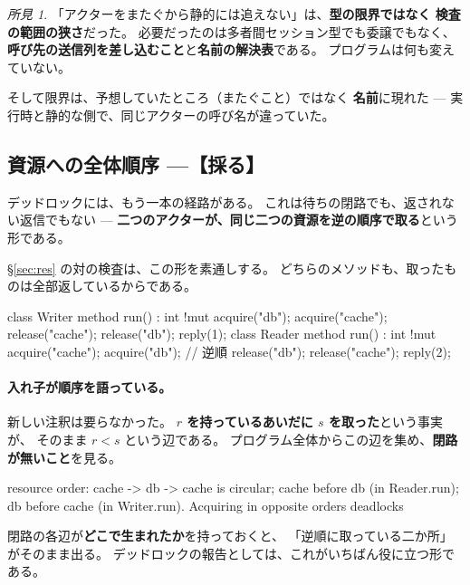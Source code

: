 \documentclass[11pt,a4paper]{ltjsarticle}
\theoremstyle{definition}
\theoremstyle{remark}
\newtheorem{finding}[theorem]{所見}
\begin{document}
\begin{finding}
「アクターをまたぐから静的には追えない」は、\textbf{型の限界ではなく
検査の範囲の狭さ}だった。
必要だったのは多者間セッション型でも委譲でもなく、
\textbf{呼び先の送信列を差し込むこと}と\textbf{名前の解決表}である。
プログラムは何も変えていない。

そして限界は、予想していたところ（またぐこと）ではなく
\textbf{名前}に現れた ---
実行時と静的な側で、同じアクターの呼び名が違っていた。
\end{finding}

\subsection{資源への全体順序 ---【採る】}

\label{sec:resorder}

デッドロックには、もう一本の経路がある。
これは待ちの閉路でも、返されない返信でもない ---
\textbf{二つのアクターが、同じ二つの資源を逆の順序で取る}という形である。

\S\ref{sec:res} の対の検査は、この形を素通しする。
どちらのメソッドも、取ったものは全部返しているからである。

\begin{aipl}
class Writer {
  method run() : int !{mut} {
    acquire("db"); acquire("cache");
    release("cache"); release("db"); reply(1);
  }
}
class Reader {
  method run() : int !{mut} {
    acquire("cache"); acquire("db");     // 逆順
    release("db"); release("cache"); reply(2);
  }
}
\end{aipl}

\paragraph{入れ子が順序を語っている。}
新しい注釈は要らなかった。
\textbf{$r$ を持っているあいだに $s$ を取った}という事実が、
そのまま $r < s$ という辺である。
プログラム全体からこの辺を集め、\textbf{閉路が無いこと}を見る。

\begin{term}
 resource order: cache -> db -> cache is circular;
  cache before db (in Reader.run); db before cache (in Writer.run).
  Acquiring in opposite orders deadlocks
\end{term}

閉路の各辺が\textbf{どこで生まれたか}を持っておくと、
「逆順に取っている二か所」がそのまま出る。
デッドロックの報告としては、これがいちばん役に立つ形である。
\end{document}
